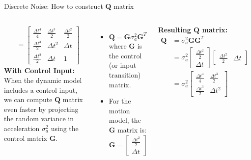 \begin{frame}{Discrete Noise: How to construct  $\mathbf{Q}$ matrix}
\begin{columns}
\begin{align*}
    & = \begin{bmatrix}
    \frac{\Delta t^4}{4} & \frac{\Delta t^3}{2} & \frac{\Delta t^2}{2} \\
    \frac{\Delta t^3}{2} & \Delta t^2 & \Delta t \\
    \frac{\Delta t^2}{2} & \Delta t & 1
    \end{bmatrix}
    \end{align*}
        \textbf{With Control Input:}
        When the dynamic model includes a control input, we can compute $\mathbf{Q}$ matrix even faster by projecting the random variance in acceleration $\sigma_a^2$ using the control matrix $\mathbf{G}$.

    \begin{itemize}
        \item $\mathbf{Q} = \mathbf{G}\sigma_a^2\mathbf{G}^T$ where $\mathbf{G}$ is the control (or input transition) matrix.
        \item For the motion model, the $\mathbf{G}$ matrix is:
        \[ \mathbf{G} = \begin{bmatrix} \frac{\Delta t^2}{2} \\ \Delta t \end{bmatrix} \]
    \end{itemize}

    \textbf{Resulting $\mathbf{Q}$ matrix:}
    \begin{align*}
        \mathbf{Q} & = \sigma_a^2 \mathbf{G} \mathbf{G}^T\\
        & = \sigma_a^2 \begin{bmatrix} \frac{\Delta t^2}{2} \\ \Delta t \end{bmatrix}\begin{bmatrix} \frac{\Delta t^2}{2} & \Delta t \end{bmatrix}\\
        & = \sigma_a^2 \begin{bmatrix} \frac{\Delta t^4}{4} & \frac{\Delta t^3}{2} \\ \frac{\Delta t^3}{2} & \Delta t^2 \end{bmatrix}
    \end{align*}
\end{columns}
\end{frame}
